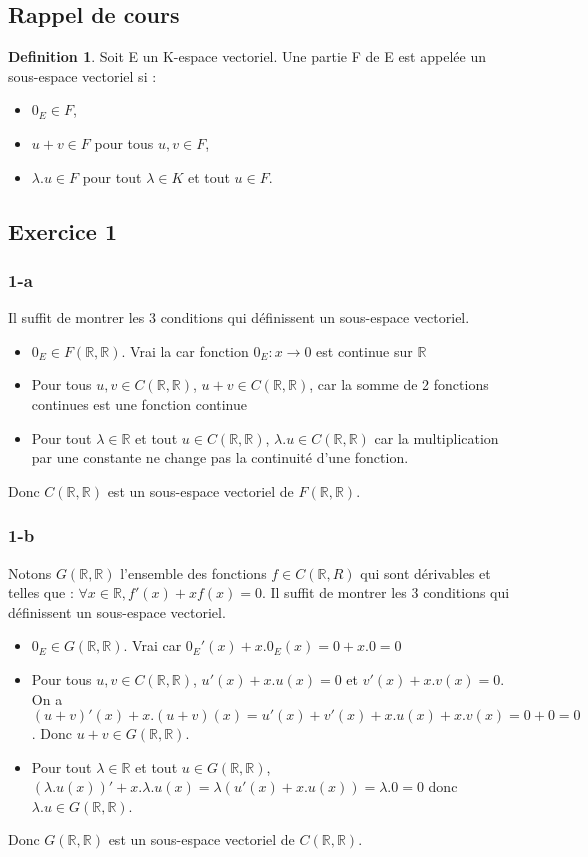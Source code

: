 \documentclass[]{book}
\theoremstyle{definition}
\newtheorem{defn}{Definition}
\newcommand{\bb}[1]{\mathbb{#1}}
\newcommand{\R}{\bb{R}}
\begin{document}
\subsection*{Rappel de cours}

\begin{defn}
Soit E un K-espace vectoriel. Une partie F de E est appelée un sous-espace vectoriel si :
\begin{itemize}
\item $0_E \in F$,
\item $u + v \in F$ pour tous $u, v \in F$,
\item $\lambda.u \in F$ pour tout $\lambda \in K$ et tout $u \in F$.
\end{itemize}
\end{defn}


\newpage
\subsection*{Exercice 1}
\subsubsection*{1-a}

Il suffit de montrer les 3 conditions qui d\'efinissent un sous-espace vectoriel.
\begin{itemize}
\item $0_E \in F(\R,\R)$. Vrai la car fonction $0_E:x\to 0$ est continue sur $\R$
\item Pour tous $u, v \in C(\R,\R)$, $u + v \in C(\R,\R)$, car la somme de 2 fonctions continues est une fonction continue 
\item Pour tout $\lambda \in \R$ et tout $u \in C(\R,\R)$, $\lambda.u \in C(\R,\R)$ car la multiplication par une constante ne change pas la continuit\'e d'une fonction.
\end{itemize}
Donc $C(\R,\R)$ est un sous-espace vectoriel de $F(\R,\R)$.

\subsubsection*{1-b}
Notons $G(\R,\R)$ l'ensemble des fonctions $f \in C(\R,R)$ qui sont d\'erivables et telles que : $\forall x \in \R, f'(x)+xf(x) = 0$.
Il suffit de montrer les 3 conditions qui d\'efinissent un sous-espace vectoriel.
\begin{itemize}
\item $0_E \in G(\R,\R)$. Vrai car $0_E'(x) + x.0_E(x) = 0 + x.0 = 0$
\item Pour tous $u, v \in C(\R,\R)$, $u'(x) + x.u(x) = 0$ et $v'(x)+x.v(x) = 0$. On a $(u+v)'(x) + x.(u+v)(x) = u'(x) + v'(x) + x.u(x) + x.v(x) = 0 + 0 = 0$. Donc  $u+v \in G(\R,\R)$.
\item Pour tout $\lambda \in \R$ et tout $u \in G(\R,\R)$, $(\lambda.u(x))'+x.\lambda.u(x) = \lambda (u'(x) + x.u(x)) = \lambda.0 = 0$ donc $\lambda.u \in G(\R,\R)$.
\end{itemize}
Donc $G(\R,\R)$ est un sous-espace vectoriel de $C(\R,\R)$.
\end{document}
